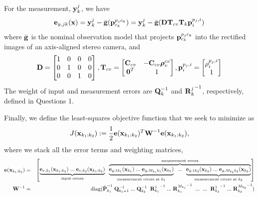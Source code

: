 \documentclass[a4paper]{article}
\begin{document}
For the measurement, $\bm{\mathbf{y}}^j_k$, we have
\begin{equation}
    \bm{\mathbf{e}}_{y, jk}(\bm{\mathbf{x}}) = \bm{\mathbf{y}}^j_k - \bar{\bm{\mathbf{g}}}(\bm{\mathbf{p}}_{c_k}^{p_j c_k}) = \bm{\mathbf{y}}^j_k - \bar{\bm{\mathbf{g}}}(\bm{\mathbf{D}} \bm{\mathbf{T}}_{cv} \bm{\mathbf{T}}_{k}\bm{\mathbf{p}}_i^{p_j, i})
\end{equation}
where $\bar{\bm{\mathbf{g}}}$ is the nominal observation model that projects $\bm{\mathbf{p}}_{c_k}^{p_j c_k}$ into the rectified images of an axis-aligned stereo camera, and 
\begin{eqnarray}
    \bm{\mathbf{D}} = \begin{bmatrix}
      1 & 0 & 0 & 0 \\ 0 & 1 & 0 & 0 \\ 0 & 0 & 1 & 0 
    \end{bmatrix}, 
    \bm{\mathbf{T}}_{cv} = \begin{bmatrix}
      \bm{\mathbf{C}}_{cv} & -\bm{\mathbf{C}}_{cv}\bm{\mathbf{\rho}}_v^{cv} \\ \bm{\mathbf{0}}^T & 1
    \end{bmatrix},
    \bm{\mathbf{p}}_i^{p_j, i} = \begin{bmatrix}
      \rho_i^{p_j, i} \\ 1
    \end{bmatrix}
\end{eqnarray}
The weight of input and measurement errors are $\bm{\mathbf{Q}}_k^{-1}$ and ${\bm{\mathbf{R}}^j_k}^{-1}$, respectively, defined in Questions 1.

Finally, we define the least-squares objective function that we seek to minimize as
\begin{equation}
    J(\bm{\mathbf{x}}_{k_1: k_2}) := \dfrac{1}{2} \bm{\mathbf{e}}(\bm{\mathbf{x}}_{k_1: k_2})^T \bm{\mathbf{W}}^{-1} \bm{\mathbf{e}}(\bm{\mathbf{x}}_{k_1: k_2}),
\end{equation}
where we stack all the error terms and weighting matrices,
\begin{eqnarray*}
    \bm{\mathbf{e}}(\bm{\mathbf{x}}_{k_1:k_2}) &=& \begin{bmatrix}
      \underbrace{\bm{\mathbf{e}}_{v, k_1}(\bm{\mathbf{x}}_{k_1:k_2})\; ...\;\bm{\mathbf{e}}_{v, k_2}(\bm{\mathbf{x}}_{k_1:k_2})}_{\text{input errors}} \;\;
      \overbrace{\underbrace{\bm{\mathbf{e}}_{y,1 k_1}(\bm{\mathbf{x}}_{k_1})\;...\;\bm{\mathbf{e}}_{y,M_{k_1} k_1}(\bm{\mathbf{x}}_{k_1})}_{\text{measurement errors at } k_1} \;\; ... \;\; \underbrace{\bm{\mathbf{e}}_{y,1 k_2}(\bm{\mathbf{x}}_{k_2})\;...\;\bm{\mathbf{e}}_{y,M_{k_2} k_2}(\bm{\mathbf{x}}_{k_2})}_{\text{measurement errors at } k_2}}^{\text{measurement errors}}
    \end{bmatrix}\\
    \bm{\mathbf{W}}^{-1} &=& \text{diag}(
      \check{\bm{\mathbf{P}}}_{k_1}^{-1} \; \bm{\mathbf{Q}}_{k_1+1}^{-1}\; ...\; \bm{\mathbf{Q}}_{k_2}^{-1} \;\; {\bm{\mathbf{R}}_{k_1}^{1}}^{-1}\;...\;{\bm{\mathbf{R}}_{k_1}^{M_{k_1}}}^{-1}\;\;...\;\;...\;\;{\bm{\mathbf{R}}_{k_2}^{1}}^{-1}\;...\;{\bm{\mathbf{R}}_{k_2}^{M_{k_2}}}^{-1}
    )
\end{eqnarray*}
\end{document}
